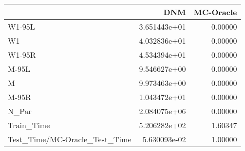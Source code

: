 \begin{tabular}{lrr}
\toprule
{} &           DNM &  MC-Oracle \\
\midrule
W1-95L                        &  3.651443e+01 &    0.00000 \\
W1                            &  4.032836e+01 &    0.00000 \\
W1-95R                        &  4.534394e+01 &    0.00000 \\
M-95L                         &  9.546627e+00 &    0.00000 \\
M                             &  9.973463e+00 &    0.00000 \\
M-95R                         &  1.043472e+01 &    0.00000 \\
N\_Par                         &  2.084075e+06 &    0.00000 \\
Train\_Time                    &  5.206282e+02 &    1.60347 \\
Test\_Time/MC-Oracle\_Test\_Time &  5.630093e-02 &    1.00000 \\
\bottomrule
\end{tabular}
